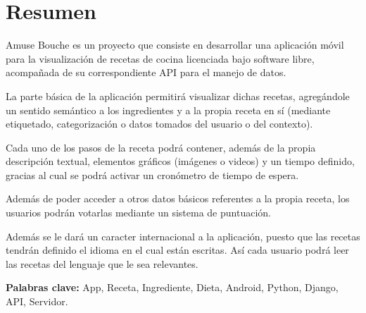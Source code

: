 \section*{Resumen}

Amuse Bouche es un proyecto que consiste en desarrollar una aplicación móvil
para la visualización de recetas de cocina licenciada bajo software libre,
acompañada de su correspondiente API para el manejo de datos.

La parte básica de la aplicación permitirá visualizar dichas recetas, agregándole
un sentido semántico a los ingredientes y a la propia receta en sí (mediante
etiquetado, categorización o datos tomados del usuario o del contexto).

Cada uno de los pasos de la receta podrá contener, además de la propia descripción
textual, elementos gráficos (imágenes o videos) y un tiempo definido, gracias al
cual se podrá activar un cronómetro de tiempo de espera.

Además de poder acceder a otros datos básicos referentes a la propia receta, los
usuarios podrán votarlas mediante un sistema de puntuación.

Además se le dará un caracter internacional a la aplicación, puesto que las
recetas tendrán definido el idioma en el cual están escritas. Así cada usuario
podrá leer las recetas del lenguaje que le sea relevantes.

\textbf{Palabras clave:} App, Receta, Ingrediente, Dieta, Android, Python, Django,
API, Servidor.

